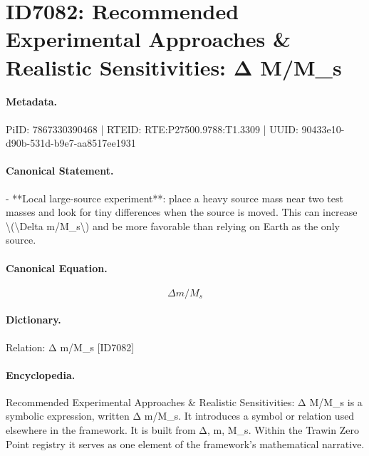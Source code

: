 \section*{ID7082: Recommended Experimental Approaches \& Realistic Sensitivities: Δ M/M\_s}
\paragraph{Metadata.}
PiID: 7867330390468 | RTEID: RTE:P27500.9788:T1.3309 | UUID: 90433e10-d90b-531d-b9e7-aa8517ee1931

\paragraph{Canonical Statement.}
- **Local large-source experiment**: place a heavy source mass near two test masses and look for tiny differences when the source is moved. This can increase \textbackslash{}(\textbackslash{}Delta m/M\_s\textbackslash{}) and be more favorable than relying on Earth as the only source.

\paragraph{Canonical Equation.}
\[
\Delta m/M_s
\]

\paragraph{Dictionary.}
Relation: Δ m/M\_s [ID7082]

\paragraph{Encyclopedia.}
Recommended Experimental Approaches \& Realistic Sensitivities: Δ M/M\_s is a symbolic expression, written Δ m/M\_s. It introduces a symbol or relation used elsewhere in the framework. It is built from Δ, m, M\_s. Within the Trawin Zero Point registry it serves as one element of the framework's mathematical narrative.
